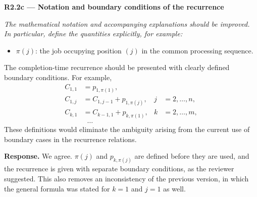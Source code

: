 \documentclass[12pt]{article}
\newenvironment{rc}[1]{\par\medskip\noindent\textbf{#1}\par\nopagebreak\noindent\itshape\renewcommand{\emph}[1]{\textbf{##1}}\ignorespaces}{\par}
\newcommand{\answer}[1]{\par\smallskip\noindent\textbf{Response.} #1\par}
\begin{document}
\begin{rc}{R2.2c --- Notation and boundary conditions of the recurrence}
The mathematical notation and accompanying explanations should be improved. In particular, define the quantities explicitly, for example:
\begin{itemize}[label=-]
\item $\pi(j)$: the job occupying position $(j)$ in the common processing sequence.
\end{itemize}
The completion-time recurrence should be presented with clearly defined boundary conditions. For example,
\begin{align*}
C_{1,1} &= p_{1,\pi(1)},\\
C_{1,j} &= C_{1,j-1}+p_{1,\pi(j)}, & j &= 2,\ldots,n,\\
C_{k,1} &= C_{k-1,1}+p_{k,\pi(1)}, & k &= 2,\ldots,m,\\
&\;\;\ldots
\end{align*}
These definitions would eliminate the ambiguity arising from the current use of boundary cases in the recurrence relations.
\end{rc}
\answer{We agree. $\pi(j)$ and $p_{k,\pi(j)}$ are defined before they are used, and the recurrence is given with separate boundary conditions, as the reviewer suggested. This also removes an inconsistency of the previous version, in which the general formula was stated for $k=1$ and $j=1$ as well.}
\end{document}

